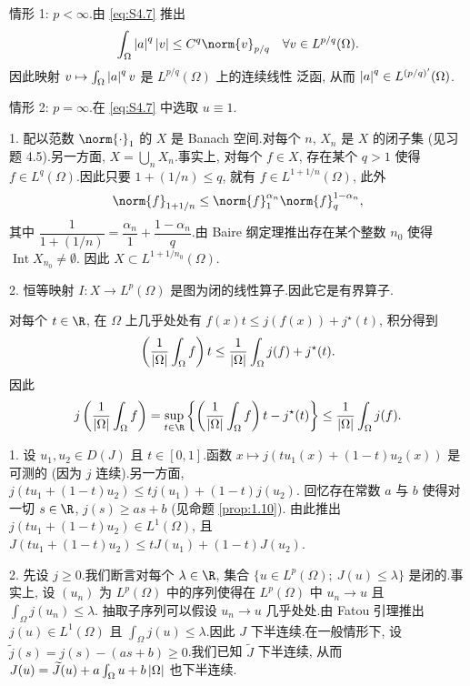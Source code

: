情形 1: $p<\infty$.由 \eqref{eq:S4.7} 推出
\begin{equation*}
\int_\Omega\abs{a}^q\abs{v}\le C^q\norm{v}_{p/q}\quad\forall v\in L^{p/q}(\Omega).
\end{equation*}
因此映射 $v\mapsto\int_\Omega\left|a\right|^qv$ 是 $L^{p/q}(\Omega)$ 上的连续线性
泛函, 从而 $\left|a\right|^q\in L^{(p/q)'}(\Omega)$.

情形 2: $p=\infty$.在 \eqref{eq:S4.7} 中选取 $u\equiv1$.


1. 配以范数 $\norm{\cdot}_1$ 的 $X$ 是 Banach 空间.对每个 $n$, $X_n$ 是
$X$ 的闭子集 (见习题 4.5).另一方面, $X=\bigcup_nX_n$.事实上, 对每个
$f\in X$, 存在某个 $q>1$ 使得 $f\in L^q(\Omega)$.因此只要
$1+(1/n)\le q$, 就有 $f\in L^{1+1/n}(\Omega)$, 此外
\begin{equation*}
\norm{f}_{1+1/n}\le\norm{f}_1^{\alpha_n}\norm{f}_q^{1-\alpha_n},
\end{equation*}
其中 $\dfrac{1}{1+(1/n)}=\dfrac{\alpha_n}{1}+\dfrac{1-\alpha_n}{q}$.由
Baire 纲定理推出存在某个整数 $n_0$ 使得 $\operatorname{Int}X_{n_0}\ne\emptyset$.
因此 $X\subset L^{1+1/n_0}(\Omega)$.

2. 恒等映射 $I:X\to L^p(\Omega)$ 是图为闭的线性算子.因此它是有界算子.


对每个 $t\in\R$, 在 $\Omega$ 上几乎处处有 $f(x)t\le j(f(x))+j^\star(t)$,
积分得到
\begin{equation*}
\left(\frac{1}{\left|\Omega\right|}\int_\Omega f\right)t
\le\frac{1}{\left|\Omega\right|}\int_\Omega j(f)+j^\star(t).
\end{equation*}
因此
\begin{equation*}
j\left(\frac{1}{\abs{\Omega}}\int_\Omega f\right)
=\sup_{t\in\R}\left\{\left(\frac{1}{\abs{\Omega}}\int_\Omega f\right)t-j^\star(t)\right\}
\le\frac{1}{\abs{\Omega}}\int_\Omega j(f).
\end{equation*}


1. 设 $u_1,u_2\in D(J)$ 且 $t\in[0,1]$.函数 $x\mapsto j(tu_1(x)+(1-t)u_2(x))$
是可测的 (因为 $j$ 连续).另一方面, $j(tu_1+(1-t)u_2)\le tj(u_1)+(1-t)j(u_2)$.
回忆存在常数 $a$ 与 $b$ 使得对一切 $s\in\R$, $j(s)\ge as+b$ (见命题  \ref{prop:1.10}).
由此推出 $j(tu_1+(1-t)u_2)\in L^1(\Omega)$, 且
$J(tu_1+(1-t)u_2)\le tJ(u_1)+(1-t)J(u_2)$.

2. 先设 $j\ge0$.我们断言对每个 $\lambda\in\R$, 集合
$\{u\in L^p(\Omega);\ J(u)\le\lambda\}$ 是闭的.事实上, 设 $(u_n)$ 为
$L^p(\Omega)$ 中的序列使得在 $L^p(\Omega)$ 中 $u_n\to u$ 且 $\int_\Omega j(u_n)\le\lambda$.
抽取子序列可以假设 $u_n\to u$ 几乎处处.由 Fatou 引理推出 $j(u)\in L^1(\Omega)$
且 $\int_\Omega j(u)\le\lambda$.因此 $J$ 下半连续.在一般情形下, 设
$\tilde j(s)=j(s)-(as+b)\ge0$.我们已知 $\widetilde J$ 下半连续, 从而
$J(u)=\widetilde J(u)+a\int_\Omega u+b\left|\Omega\right|$ 也下半连续.

